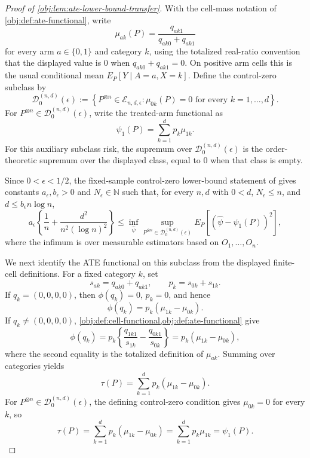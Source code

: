\begin{proof}[Proof of \cref{obj:lem:ate-lower-bound-transfer}]
With the cell-mass notation of \cref{obj:def:ate-functional}, write
\[
\mu_{ak}(P)=\frac{q_{ak1}}{q_{ak0}+q_{ak1}}
\]
for every arm \(a\in\{0,1\}\) and category \(k\), using the totalized real-ratio convention that the displayed value is \(0\) when \(q_{ak0}+q_{ak1}=0\).  On positive arm cells this is the usual conditional mean \(E_P[Y\mid A=a,X=k]\).
Define the control-zero subclass by
\[
\mathcal D_0^{(n,d)}(\epsilon)
:=
\left\{
P^{\otimes n}\in\mathcal E_{n,d,\epsilon}:
\mu_{0k}(P)=0\text{ for every }k=1,\ldots,d
\right\}.
\]
For \(P^{\otimes n}\in\mathcal D_0^{(n,d)}(\epsilon)\), write the treated-arm functional as
\[
\psi_1(P)=\sum_{k=1}^d p_k\mu_{1k}.
\]
For this auxiliary subclass risk, the supremum over \(\mathcal D_0^{(n,d)}(\epsilon)\) is the order-theoretic supremum over the displayed class, equal to \(0\) when that class is empty.

Since \(0<\epsilon<1/2\), the fixed-sample control-zero lower-bound statement of \citep{ZengBalakrishnanHanKennedy2024} gives constants \(a_\epsilon,b_\epsilon>0\) and \(N_\epsilon\in\mathbb N\) such that, for every \(n,d\) with \(0<d\), \(N_\epsilon\le n\), and \(d\le b_\epsilon n\log n\),
\[
a_\epsilon\left\{\frac1n+\frac{d^2}{n^2(\log n)^2}\right\}
\le
\inf_{\widehat\psi}
\sup_{P^{\otimes n}\in\mathcal D_0^{(n,d)}(\epsilon)}
E_P\!\left[(\widehat\psi-\psi_1(P))^2\right],
\]
where the infimum is over measurable estimators based on \(O_1,\ldots,O_n\).

We next identify the ATE functional on this subclass from the displayed finite-cell definitions.  For a fixed category \(k\), set
\[
s_{ak}=q_{ak0}+q_{ak1},
\qquad
p_k=s_{0k}+s_{1k}.
\]
If \(q_k=(0,0,0,0)\), then \(\phi(q_k)=0\), \(p_k=0\), and hence
\[
\phi(q_k)=p_k(\mu_{1k}-\mu_{0k}).
\]
If \(q_k\ne(0,0,0,0)\), \cref{obj:def:cell-functional,obj:def:ate-functional} give
\[
\phi(q_k)
=
p_k\left\{\frac{q_{1k1}}{s_{1k}}-\frac{q_{0k1}}{s_{0k}}\right\}
=
p_k(\mu_{1k}-\mu_{0k}),
\]
where the second equality is the totalized definition of \(\mu_{ak}\).  Summing over categories yields
\[
\tau(P)=\sum_{k=1}^d p_k(\mu_{1k}-\mu_{0k}).
\]
For \(P^{\otimes n}\in\mathcal D_0^{(n,d)}(\epsilon)\), the defining control-zero condition gives \(\mu_{0k}=0\) for every \(k\), so
\[
\tau(P)
=
\sum_{k=1}^d p_k(\mu_{1k}-\mu_{0k})
=
\sum_{k=1}^d p_k\mu_{1k}
=
\psi_1(P).
\]


\end{proof}

